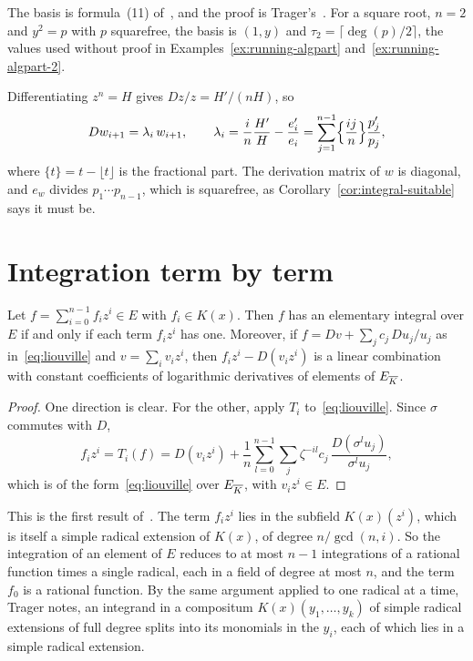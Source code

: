 The basis is formula~(11) of~\cite[\S2.2]{bronstein1998tutorial}, and the
proof is Trager's~\cite[\S2.5]{trager1984}. For a square root, $n = 2$ and
$y^2 = p$ with $p$ squarefree, the basis is $(1, y)$ and $\tau_2 = \lceil
\deg(p)/2 \rceil$, the values used without proof in
Examples~\ref{ex:running-algpart} and~\ref{ex:running-algpart-2}.

Differentiating $z^n = H$ gives $Dz/z = H'/(nH)$, so
\begin{equation}\label{eq:radical-derivative}
  D w_{i+1} = \lambda_i\, w_{i+1}, \qquad
  \lambda_i = \frac{i}{n} \frac{H'}{H} - \frac{e_i'}{e_i}
            = \sum_{j=1}^{n-1} \Bigl\{ \frac{ij}{n} \Bigr\} \frac{p_j'}{p_j} ,
\end{equation}
where $\{t\} = t - \lfloor t \rfloor$ is the fractional part. The derivation
matrix of $w$ is diagonal, and $e_w$ divides $p_1 \cdots p_{n-1}$, which is
squarefree, as Corollary~\ref{cor:integral-suitable} says it must be.

\section{Integration term by term}\label{sec:radical-termwise}

\begin{theorem}\label{thm:radical-termwise}
Let $f = \sum_{i=0}^{n-1} f_i z^i \in E$ with $f_i \in K(x)$. Then $f$ has an
elementary integral over $E$ if and only if each term $f_i z^i$ has one.
Moreover, if $f = Dv + \sum_j c_j\, Du_j/u_j$ as in~\eqref{eq:liouville} and
$v = \sum_i v_i z^i$, then $f_i z^i - D(v_i z^i)$ is a linear combination with
constant coefficients of logarithmic derivatives of elements of $E_{\overline{K}}$.
\end{theorem}

\begin{proof}
One direction is clear. For the other, apply $T_i$ to~\eqref{eq:liouville}.
Since $\sigma$ commutes with $D$,
\[
  f_i z^i = T_i(f) = D(v_i z^i)
    + \frac{1}{n} \sum_{l=0}^{n-1} \sum_j \zeta^{-il} c_j\,
      \frac{D(\sigma^l u_j)}{\sigma^l u_j} ,
\]
which is of the form~\eqref{eq:liouville} over $E_{\overline{K}}$, with $v_i z^i \in
E$.
\end{proof}

This is the first result of~\cite[Appendix~A]{trager1984}. The term $f_i z^i$
lies in the subfield $K(x)(z^i)$, which is itself a simple radical extension
of $K(x)$, of degree $n/\gcd(n, i)$. So the integration of an element of $E$
reduces to at most $n - 1$ integrations of a rational function times a single
radical, each in a field of degree at most $n$, and the term $f_0$ is a
rational function. By the same argument applied to one radical at a time,
Trager notes, an integrand in a compositum $K(x)(y_1, \dots, y_k)$ of simple
radical extensions of full degree splits into its monomials in the $y_i$,
each of which lies in a simple radical extension.

